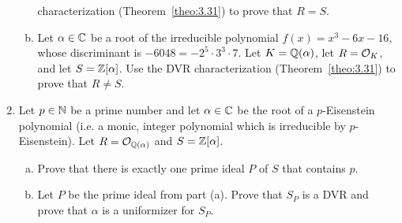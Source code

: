\begin{enumerate}[leftmargin=1.5cm, label={{\bf A6-\arabic*}}]
\begin{enumerate}[(a)]
        characterization (Theorem~\ref{theo:3.31}) to prove that $R = S$. 
        \item Let $\alpha \in \mathbb{C}$ be a root of the irreducible polynomial 
        $f(x) = x^3 - 6x - 16$, whose discriminant is 
        $-6048 = -2^5 \cdot 3^3 \cdot 7$. Let $K = \mathbb{Q}(\alpha)$, 
        let $R = {\cal O}_K$, and let $S = \mathbb{Z}[\alpha]$. Use the DVR 
        characterization (Theorem~\ref{theo:3.31}) to prove that $R \neq S$. 
    \end{enumerate}
    \item \label{A6-4} Let $p \in \mathbb{N}$ be a prime number and let $\alpha \in \mathbb{C}$ 
    be the root of a $p$-Eisenstein polynomial (i.e. a monic, integer polynomial 
    which is irreducible by $p$-Eisenstein). Let $R = {\cal O}_{\mathbb{Q}(\alpha)}$ 
    and $S = \mathbb{Z}[\alpha]$. 
    \begin{enumerate}[(a)]
        \item Prove that there is exactly one prime ideal $P$ of $S$ that contains $p$. 
        \item Let $P$ be the prime ideal from part (a). Prove that $S_P$ is a DVR 
        and prove that $\alpha$ is a uniformizer for $S_P$. 
    \end{enumerate}
\end{enumerate}